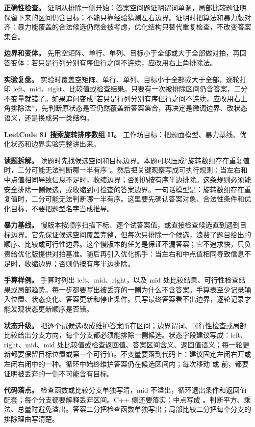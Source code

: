 \textbf{正确性检查。} 证明从排除一侧开始：答案空间题证明谓词单调，局部比较题证明保留下来的区间仍含目标；不能只靠经验猜测左右边界。证明时把算法和暴力版对齐：暴力能覆盖的合法候选仍然会被考虑，优化结构只替代重复检查，不改变答案集合。

\textbf{边界和变体。} 先用空矩阵、单行、单列、目标小于全部或大于全部做对拍，再回答变体：若只是行列分别有序但行之间不连续，应改用右上角排除法。

\textbf{实验复盘。} 实验时覆盖空矩阵、单行、单列、目标小于全部或大于全部，逐轮打印 left、mid、right、比较值或检查结果。只要有一次被排除区间仍含答案，二分不变量就错了。如果追问变成“若只是行列分别有序但行之间不连续，应改用右上角排除法”，先判断原状态是否仍然覆盖新答案集合，再决定是微调边界、改状态语义，还是换成另一类结构。

\noindent\textbf{LeetCode 81 搜索旋转排序数组 II。} 工作坊目标：把题面模型、暴力基线、优化状态和边界实验完整讲出来。

\textbf{读题拆解。} 读题时先找候选空间和目标边界。本题可以压成“旋转数组存在重复值时，二分可能无法判断哪一半有序”。然后把关键观察写成可执行规则：当左右和中点值相同导致信息不足时，收缩边界；否则仍按有序半边排除。这条规则必须能安全排除一侧候选，或收缩到可检查的答案边界。一句话模型是：旋转数组存在重复值时，二分可能无法判断哪一半有序。这里要先确认答案对象、合法性条件和优化目标，不要把题型名字当成推导。

\textbf{暴力基线。} 慢版本按顺序扫描下标、逐个试答案值，或直接检查候选直到遇到目标边界。它先保证候选空间覆盖完整，但每次只排除一个候选，浪费了题目给出的顺序、比较或可行性边界。这个慢版本的任务是保证不漏答案；它不追求快，只负责给优化版提供对拍基准。随后再引入优化抓手：当左右和中点值相同导致信息不足时，收缩边界；否则仍按有序半边排除。

\textbf{手算样例。} 手算时列出 left、mid、right，以及 mid 处比较结果、可行性检查结果或局部趋势。每一步都要写出被丢弃的一侧为什么不含答案。手算表至少记录输入位置、状态变化、答案更新和停止条件。只写最终答案看不出边界，逐轮记录才能发现状态更新顺序是否错。

\textbf{状态升级。} 把逐个试候选改成维护答案所在区间；边界谓词、可行性检查或局部比较给出分支方向，每个分支都必须能排除一侧候选。状态字段建议写成：left、right、mid、mid 处比较值或检查返回值、答案区间含义、返回值语义；每一轮更新都要保留目标位置或第一个可行值。不变量要落到代码上：建议固定左闭右开或左闭右闭中的一种。循环中始终维护答案仍在候选区间内；每次移动  或  前，都要证明被丢弃的一侧不可能含有目标。

\textbf{代码落点。} 检查函数或比较分支单独写清，mid 不溢出，循环退出条件和返回值配套；每个分支都要解释丢弃区间。C++ 侧还要落实：中点写成 。判断平方、乘法、总量时避免溢出。答案二分把检查函数单独写出；局部比较二分把每个分支的排除理由写清楚。

